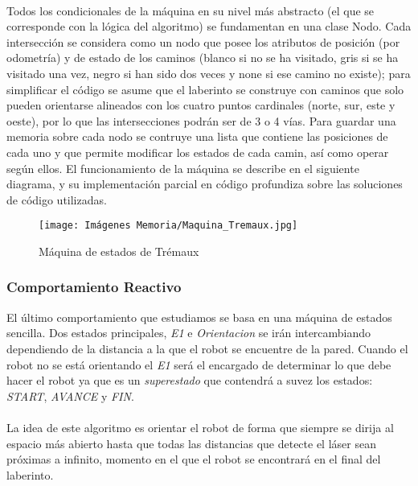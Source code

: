 \documentclass[a4paper,9pt]{article}
\begin{document}
\paragraph{}
Todos los condicionales de la máquina en su nivel más abstracto (el que se corresponde con la lógica del algoritmo) se fundamentan en una clase Nodo. Cada intersección se considera como un nodo que posee los atributos de posición (por odometría) y de estado de los caminos (blanco si no se ha visitado, gris si se ha visitado una vez, negro si han sido dos veces y none si ese camino no existe); para simplificar el código se asume que el laberinto se construye con caminos que solo pueden orientarse alineados con los cuatro puntos cardinales (norte, sur, este y oeste), por lo que las intersecciones podrán ser de 3 o 4 vías. Para guardar una memoria sobre cada nodo se contruye una lista que contiene las posiciones de cada uno y que permite modificar los estados de cada camin, así como operar según ellos. El funcionamiento de la máquina se describe en el siguiente diagrama, y su implementación parcial en código profundiza sobre las soluciones de código utilizadas.

\begin{figure}[h!]
    \centering
    \texttt{[image: Imágenes Memoria/Maquina\_Tremaux.jpg]}
    \caption{Máquina de estados de Trémaux}
    \label{fig:Tremaux}
\end{figure}


\subsubsection{Comportamiento Reactivo}
El último comportamiento que estudiamos se basa en una máquina de estados sencilla. Dos estados principales, \textit{E1} e \textit{Orientacion} se irán intercambiando dependiendo de la distancia a la que el robot se encuentre de la pared. Cuando el robot no se está orientando el \textit{E1} será el encargado de determinar lo que debe hacer el robot ya que es un \textit{superestado} que contendrá a suvez los estados: \textit{START}, \textit{AVANCE} y \textit{FIN}.
\paragraph{}
La idea de este algoritmo es orientar el robot de forma que siempre se dirija al espacio más abierto hasta que todas las distancias que detecte el láser sean próximas a infinito, momento en el que el robot se encontrará en el final del laberinto.
\end{document}
